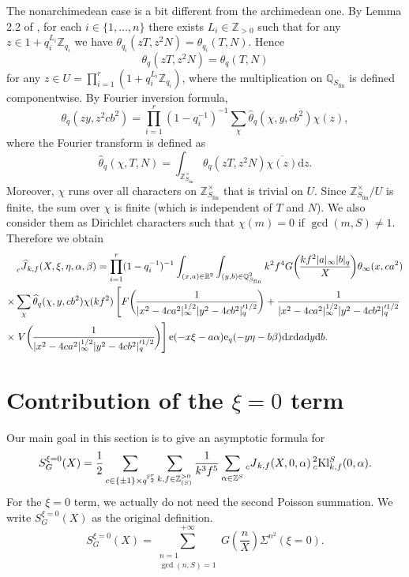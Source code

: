 \documentclass[10pt,oneside,reqno]{amsart}
\newcommand\rmd{\mathrm{d}}
\newcommand\rme{\mathrm{e}}
\newcommand\FF{\mathbb{F}}
\newcommand\QQ{\mathbb{Q}}
\newcommand\RR{\mathbb{R}}
\newcommand\ZZ{\mathbb{Z}}
\newcommand\fin{\mathrm{fin}}
\newcommand\Kl{\mathrm{Kl}}
\newcommand\legendresymbol[2]{\genfrac{(}{)}{}{}{#1}{#2}}
\theoremstyle{THEOREM}
\theoremstyle{DEFINITION}
\theoremstyle{EXERCISE}
\numberwithin{equation}{section}
\begin{document}
The nonarchimedean case is a bit different from the archimedean one. 
By Lemma 2.2 of \cite{cheng2025c}, for each $i\in \{1,\dots,n\}$ there exists $L_i\in \ZZ_{>0}$ such that for any $z\in 1+q_i^{L_i}\ZZ_{q_i}$ we have
$\theta_{q_i}(zT,z^2N)=\theta_{q_i}(T,N)$.
Hence
\[
\theta_{q}(zT,z^2N)=\theta_{q}(T,N)
\]
for any $z\in U=\prod_{i=1}^{r} (1+q_i^{L_i}\ZZ_{q_i})$, where the multiplication on $\QQ_{S_\fin}$ is defined componentwise.  By Fourier inversion formula,
\[
\theta_q(zy,z^2cb^2)=\prod_{i=1}^{r}(1-q_i^{-1})^{-1}\sum_{\chi} \widehat{\theta}_q(\chi,y,cb^2)\chi(z),
\]
where the Fourier transform is defined as
\[
\widehat{\theta}_q(\chi,T,N)=\int_{\ZZ_{S_\fin}^\times}\theta_q(zT,z^2N)\overline{\chi(z)}\rmd z.
\]
Moreover,  $\chi$ runs over all characters on $\ZZ_{S_\fin}^\times$ that is trivial on $U$. Since $\ZZ_{S_\fin}^\times/U$ is finite, the sum over $\chi$ is finite (which is independent of $T$ and $N$). We also consider them as Dirichlet characters such that $\chi(m)=0$ if $\gcd(m,S)\neq 1$. Therefore we obtain
\begin{equation}\label{eq:transformedj}
\begin{split} 
&\prescript{}{c}{\widehat{J}}_{k,f}(X,\xi,\eta,\alpha,\beta)=\prod_{i=1}^{r}(1-q_i^{-1})^{-1} \int_{(x,a)\in\RR^2}\int_{(y,b)\in\QQ_{S_\fin}^2} k^2f^4 G\legendresymbol{kf^2|a|_\infty|b|_q}{X} \theta_\infty(x,ca^2)\\
\times&\sum_{\chi}\widehat{\theta}_{q}(\chi,y,cb^2)\chi(kf^2)\left[F\legendresymbol {1}{|x^2-4ca^2|_\infty^{1/2}|y^2- 4cb^2|_q'^{1/2}}+\frac{1}{|x^2-4ca^2|_\infty^{1/2}|y^2- 4cb^2|_q'^{1/2}}\right.\\
\times&\left.V\legendresymbol{1}{|x^2-4ca^2|_\infty^{1/2}|y^2- 4cb^2|_q'^{1/2}}\right]\rme(-x\xi-a\alpha)\rme_{q}(-y\eta-b\beta)\rmd x\rmd a\rmd y\rmd b.
\end{split}
\end{equation}

\section{Contribution of the $\xi=0$ term}
Our main goal in this section is to give an asymptotic formula for
\[
S_G^{\xi=0}(X)=\frac12\sum_{c\in \{\pm 1\}\times q^{\FF_2^r}}\sum_{k,f\in \ZZ_{(S)}^{>0}}\frac{1}{k^3f^5}\sum_{\alpha\in \ZZ^S}\prescript{}{c}{J}_{k,f}(X,0,\alpha)\prescript{2}{c}{\Kl}_{k,f}^S(0,\alpha).
\]
For the $\xi=0$ term, we actually do not need the second Poisson summation. We write $S_G^{\xi=0}(X)$ as the original definition.
\[
S_G^{\xi=0}(X)=\sum_{\substack{n=1\\\gcd(n,S)=1}}^{+\infty}G\legendresymbol{n}{X}\Sigma^{n^2}(\xi=0).
\]
\end{document}
